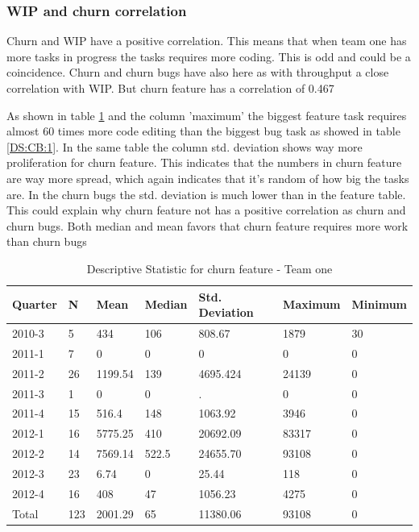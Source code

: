 \documentclass[UKenglish]{ifimaster}  %
\begin{document}
\newpage

\subsubsection{WIP and churn correlation}
Churn and WIP have a positive correlation. This means that when team one has more tasks in progress the tasks requires more coding. This is odd and could be a coincidence. Churn and churn bugs have also here as with throughput a close correlation with WIP. But churn feature has a correlation of 0.467 %
 
As shown in table \ref{DS:CF:1}  and the column 'maximum' the biggest feature task requires almost 60 times more code editing than the biggest bug task as showed in table \ref{DS:CB:1}. In the same table the column std. deviation shows way more proliferation for churn feature. This indicates that the numbers in churn feature are way more spread, which again indicates that it's random of how big the tasks are. In the churn bugs the std. deviation is much lower than in the feature table. This could explain why churn feature not has a positive correlation as churn and churn bugs.  Both median and mean favors that churn feature requires more work than churn bugs




\begin{table}[!htbp]
\centering
\begin{tabular}{ | l | l | l | l | l | l | l | }
\hline
	Quarter & N & Mean & Median & Std. Deviation & Maximum & Minimum \\ \hline
	2010-3 & 5 & 434 & 106 & 808.67 & 1879 & 30 \\ \hline
	2011-1 & 7 & 0 & 0 & 0 & 0 & 0 \\ \hline
	2011-2 & 26 & 1199.54 & 139 & 4695.424 & 24139 & 0 \\ \hline
	2011-3 & 1 & 0 & 0 & . & 0 & 0 \\ \hline
	2011-4 & 15 & 516.4 & 148 & 1063.92 & 3946 & 0 \\ \hline
	2012-1 & 16 & 5775.25 & 410 & 20692.09 & 83317 & 0 \\ \hline
	2012-2 & 14 & 7569.14 & 522.5 & 24655.70 & 93108 & 0 \\ \hline
	2012-3 & 23 & 6.74 & 0 & 25.44 & 118 & 0 \\ \hline
	2012-4 & 16 & 408 & 47 & 1056.23 & 4275 & 0 \\ \hline
	Total & 123 & 2001.29 & 65 & 11380.06 & 93108 & 0 \\ \hline
\end{tabular}
   \caption{Descriptive Statistic for churn feature - Team one}
  \label{DS:CF:1}%
\end{table}%
\end{document}
